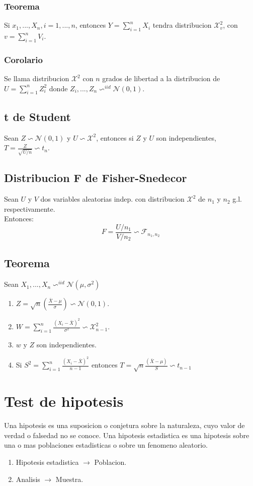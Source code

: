 \documentclass[titlepage,a4paper]{article}
\begin{document}
\subsubsection{Teorema}
Si $x_{1},...,X_{n}, i=1,...,n$, entonces $Y= \sum_{i=1}^{n}X_{i}$ tendra distribucion $\mathcal{X}^{2}_{v}$, con $v =\sum_{i=1}^{n} V_{i} $.
\subsubsection{Corolario}
Se llama distribucion $\mathcal{X}^{2}$ con $n$ grados de libertad a la distribucion de $U = \sum_{i=1}^{n} Z_{i}^{2}$ donde $Z_{i},...,Z_{n} \backsim^{iid} \mathcal{N}(0,1)$.
\subsection{t de Student}
Sean $Z \backsim \mathcal{N}(0,1)$ y $U \backsim \mathcal{X}^{2}$, entonces si $Z$ y $U$ son independientes, $T= \frac{Z}{\sqrt{U/n}} \backsim t_{n}$.
\subsection{Distribucion F de Fisher-Snedecor}
Sean $U$ y $V$ dos variables aleatorias indep. con distribucion $\mathcal{X}^{2}$ de $n_{1}$ y $n_{2}$ g.l. respectivamente.\\
Entonces:
\begin{equation*}
    F=\frac{U/n_{1}}{V/n_{2}} \backsim \mathcal{F}_{n_{1},n_{2}}
\end{equation*}
\subsection{Teorema}
Sean $X_{1},...,X_{n} \backsim^{iid} \mathcal{N}(\mu,\sigma^{2})$
\begin{enumerate}
    \item $Z=\sqrt{n} (\frac{\bar{X} - \mu}{\sigma}) \backsim \mathcal{N}(0,1)$.
    \item $W = \sum_{i=1}^{n}\frac{(X_{i}-\bar{X})^{2}}{\sigma^{2}} \backsim \mathcal{X}_{n-1}^{2}$.
    \item $w$ y $Z$ son independientes.
    \item Si $S^{2} = \sum_{i=1}^{n} \frac{(X_{i}-\bar{X})^{2}}{n-1} $ entonces $T = \sqrt{n}\frac{(\bar{X} - \mu)}{S} \backsim t_{n-1}$
\end{enumerate}
\section{Test de hipotesis}
Una hipotesis es una suposicion o conjetura sobre la naturaleza, cuyo valor de verdad o falsedad no se conoce. Una hipotesis estadistica es una hipotesis sobre una o mas poblaciones estadisticas o sobre un fenomeno aleatorio.
\begin{enumerate}
    \item Hipotesis estadistica $\rightarrow$ Poblacion.
    \item Analisis $\rightarrow$ Muestra.
\end{enumerate}
\end{document}
